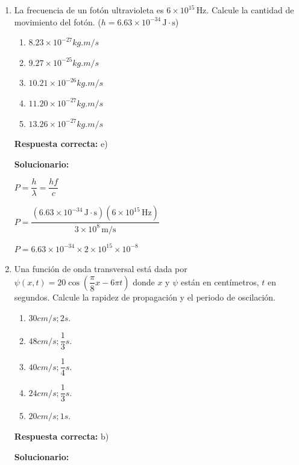 \begin{enumerate}[resume]
	$\vec{F} = 3 \times 10^{-3} (0\hat{i} + 4 \times 10^3\hat{J} - 2 \times 10^3\hat{k})$


	\vspace{6mm}

		\item La frecuencia de un fotón ultravioleta es $6 \times 10^{15} \, \text{Hz}$. Calcule la cantidad de movimiento del fotón. ($h = 6.63 \times 10^{-34} \, \text{J}\cdot\text{s}$)
	\begin{enumerate}[label=\alph*)]
		\item $8.23\times10^{-27} kg. m/s$
		\item $9.27\times10^{-25} kg. m/s$
		\item $10.21\times10^{-26} kg. m/s$
		\item $11.20\times10^{-27} kg. m/s$
		\item $13.26\times10^{-27} kg. m/s$
	\end{enumerate}
	\textbf{Respuesta correcta:} e)

	\vspace{2mm}
	\textbf{Solucionario:}

	$P = \dfrac{h}{\lambda} = \dfrac{hf}{c}$

	$P = \dfrac{(6.63 \times 10^{-34} \, \text{J}\cdot\text{s})(6 \times 10^{15} \, \text{Hz})}{3 \times 10^8 \, \text{m/s}}$

	$P = 6.63 \times 10^{-34} \times 2 \times 10^{15} \times 10^{-8}$

	\vspace{6mm}

	\item Una función de onda transversal está dada por $\psi(x,t)=20\cos(\dfrac{\pi}{8}x-6\pi t)$ donde $x$ y $\psi$ están en centímetros, $t$ en segundos. Calcule la rapidez de propagación y el periodo de oscilación.
	\begin{enumerate}[label=\alph*)]
		\item $30 cm/s ; 2s.$
		\item $48 cm/s ; \dfrac{1}{3}s.$
		\item $40 cm/s ; \dfrac{1}{4}s.$
		\item $24 cm/s ; \dfrac{1}{3}s.$
		\item $20 cm/s ; 1s.$
	\end{enumerate}
	\textbf{Respuesta correcta:} b)

	\vspace{2mm}
	\textbf{Solucionario:}


\end{enumerate}
